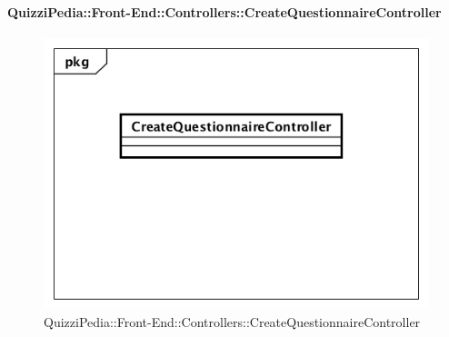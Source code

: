 \paragraph{QuizziPedia::Front-End::Controllers::CreateQuestionnaireController}
\begin{figure} [ht]
	\centering
	\includegraphics[scale=0.45]{UML/Classi/Front-End/QuizziPedia_Front-end_Controller_CreateQuestionnaireController.png}
	\caption{QuizziPedia::Front-End::Controllers::CreateQuestionnaireController}
\end{figure} \FloatBarrier
